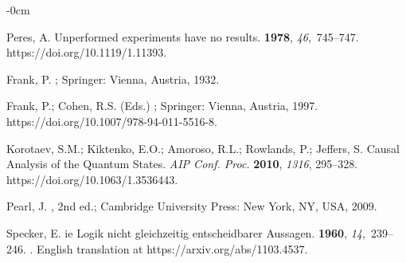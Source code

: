 \documentclass[entropy,article,accept,oneauthor,pdftex]{Definitions/mdpi}
\begin{document}
\begin{adjustwidth}{-\extralength}{0cm}
{}






\begin{thebibliography}{999}

Peres, A.
\newblock Unperformed experiments have no results.
 {\bf 1978}, {\em 46},~745--747.
\newblock
  {https://doi.org/10.1119/1.11393}.

Frank, P.
; Springer: Vienna, Austria,
  1932.

Frank, P.; {Cohen, R.S. (Eds.)}
;
  Springer: Vienna,  Austria, 1997.
\newblock
  {https://doi.org/10.1007/978-94-011-5516-8}.

Korotaev, S.M.; Kiktenko, E.O.; Amoroso, R.L.; Rowlands, P.; Jeffers, S.
\newblock Causal Analysis of the Quantum States.
\newblock  \emph{{AIP} Conf. Proc.}  \textbf{2010}, \emph{1316}, 295--328.
\newblock
  {https://doi.org/10.1063/1.3536443}.

Pearl, J.
, 2nd ed.; Cambridge University Press: New York, NY, USA,
  2009.


Specker, E.
ie {L}ogik nicht gleichzeitig entscheidbarer {A}ussagen.
 {\bf 1960}, {\em 14},~239--246.
.
\newblock English translation at {https://arxiv.org/abs/1103.4537}.



\end{thebibliography}
\end{adjustwidth}
\end{document}
